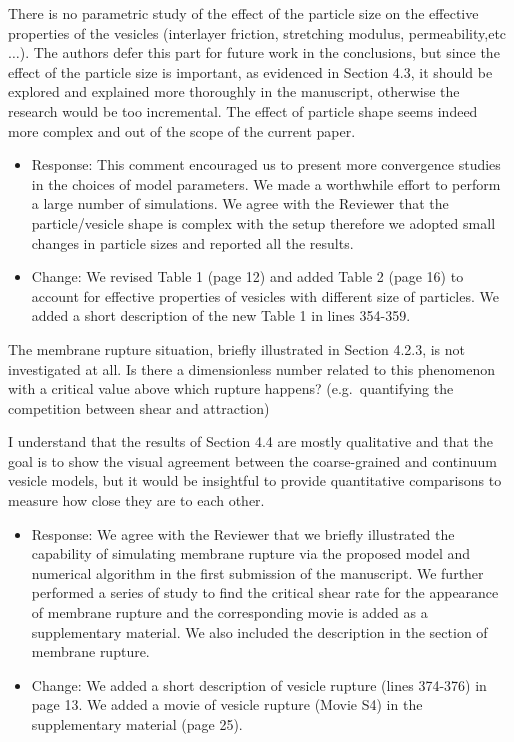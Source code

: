 \documentclass[11pt]{article}
\newcommand{\comment}[1]{{\color{blue} #1}}
\begin{document}
\noindent
\comment{There is no parametric study of the effect of the particle size
on the effective properties of the vesicles (interlayer friction,
stretching modulus, permeability,etc$\ldots$). The authors defer this
part for future work in the conclusions, but since the effect of the
particle size is important, as evidenced in Section 4.3, it should be
explored and explained more thoroughly in the manuscript, otherwise the
research would be too incremental. The effect of particle shape seems
indeed more complex and out of the scope of the current paper.}
\begin{itemize}
  \item Response: This comment encouraged us to present more convergence studies in the choices of model parameters. We made a worthwhile effort to perform a large number of simulations. We agree with the Reviewer that the particle/vesicle shape is complex with the setup therefore we adopted small changes in particle sizes and reported all the results.
  \item Change: We revised Table 1 (page 12) and added Table 2 (page 16) to account for effective properties of vesicles with different size of particles. We added a short description of the new Table 1 in lines 354-359. 
\end{itemize}

\noindent
\comment{The membrane rupture situation, briefly illustrated in Section
4.2.3, is not investigated at all. Is there a dimensionless number
related to this phenomenon with a critical value above which rupture
happens? (e.g.~quantifying the competition between shear and
attraction)}

\noindent
\comment{I understand that the results of Section 4.4 are mostly
qualitative and that the goal is to show the visual agreement between
the coarse-grained and continuum vesicle models, but it would be
insightful to provide quantitative comparisons to measure how close they
are to each other.}
\begin{itemize}
  \item Response: We agree with the Reviewer that we briefly illustrated the capability of simulating membrane rupture via the proposed model and numerical algorithm in the first submission of the manuscript. We further performed a series of study to find the critical shear rate for the appearance of membrane rupture and the corresponding movie is added as a supplementary material. We also included the description in the section of membrane rupture.
  \item Change: We added a short description of vesicle rupture (lines 374-376) in page 13. We added a movie of vesicle rupture (Movie S4) in the supplementary material (page 25).
  
\end{itemize}
\end{document}
